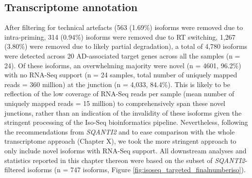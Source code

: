 \clearpage
\subsection{Transcriptome annotation}
After filtering for technical artefacts (563 (1.69\%) isoforms were removed due to intra-priming, 314 (0.94\%) isoforms were removed due to RT switching, 1,267 (3.80\%) were removed due to likely partial degradation), a total of 4,780 isoforms were detected across 20 AD-associated target genes across all the samples (n = 24). Of these isoforms, an overwhelming majority were novel (n = 4601, 96.2\%) with no RNA-Seq support (n = 24 samples, total number of uniquely mapped reads = 360 million) at the junction (n = 4,033, 84.4\%). This is likely to be reflection of the low coverage of RNA-Seq reads per sample  (mean number of uniquely mapped reads = 15 million) to comprehensively span these novel junctions, rather than an indication of the invalidity of these isoforms given the stringent processing of the Iso-Seq bioinformatics pipeline. Nevertheless, following the recommendations from \textit{SQANTI2} and to ease comparison with the whole transcriptome approach (Chapter X), we took the more stringent approach to only include novel isoforms with RNA-Seq support. All downstream analyses and statistics reported in this chapter thereon were based on the subset of \textit{SQANTI2}-filtered isoforms (n = 747 isoforms, Figure \ref{fig:isoseq_targeted_finalnumberiso}).


